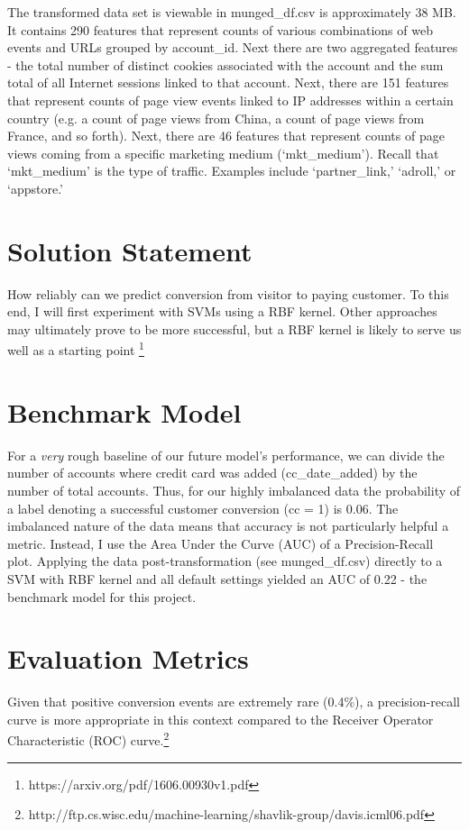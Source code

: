 \documentclass{article} %
\begin{document}
\indent The transformed data set is viewable in munged\_df.csv is approximately 38 MB. It contains 290 features that represent counts of various combinations of web events and URLs grouped by account\_id. Next there are two aggregated features - the total number of distinct cookies associated with the account and the sum total of all Internet sessions linked to that account. Next, there are 151 features that represent counts of page view events linked to IP addresses within a certain country (e.g. a count of page views from China, a count of page views from France, and so forth). Next, there are 46 features that represent counts of page views coming from a specific marketing medium (`mkt\_medium'). Recall that `mkt\_medium' is the type of traffic. Examples include `partner\_link,' `adroll,' or `appstore.'
                                                              
\section{Solution Statement}
\indent\indent How reliably can we predict conversion from visitor to paying customer. To this end, I will first experiment with SVMs using a RBF kernel. Other approaches may ultimately prove to be more successful, but a RBF kernel is likely to serve us well as a starting point \footnote{https://arxiv.org/pdf/1606.00930v1.pdf} \\

\section{Benchmark Model}
\indent\indent For a \textit{very} rough baseline of our future model's performance, we can divide the number of accounts where credit card was added (cc\_date\_added) by the number of total accounts. Thus, for our highly imbalanced data the probability of a label denoting a successful customer conversion (cc = 1) is 0.06. The imbalanced nature of the data means that accuracy is not particularly helpful a metric. Instead, I use the Area Under the Curve (AUC) of a Precision-Recall plot. Applying the data post-transformation (see munged\_df.csv) directly to a SVM with RBF kernel and all default settings yielded an AUC of 0.22 - the benchmark model for this project. 

\section{Evaluation Metrics}
\indent\indent Given that positive conversion events are extremely rare (0.4\%), a precision-recall curve is more appropriate in this context compared to the Receiver Operator Characteristic (ROC) curve.\footnote{http://ftp.cs.wisc.edu/machine-learning/shavlik-group/davis.icml06.pdf}\\
\end{document}
